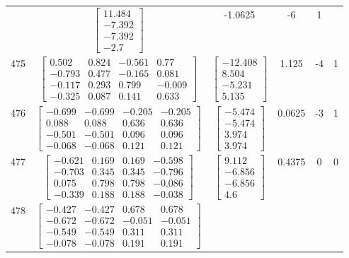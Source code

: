 \documentclass[a4paper,12pt]{article}
\begin{document}
\begin{tabular}{c c c c c c}
&
$\begin{bmatrix} 11.484 \\ -7.392 \\ -7.392 \\ -2.7 \end{bmatrix}$
&
-1.0625
&
-6
&
1
\\
475
&
$\begin{bmatrix} 0.502 & 0.824 & -0.561 & 0.77 \\ -0.793 & 0.477 & -0.165 & 0.081 \\ -0.117 & 0.293 & 0.799 & -0.009 \\ -0.325 & 0.087 & 0.141 & 0.633 \end{bmatrix}$
&
$\begin{bmatrix} -12.408 \\ 8.504 \\ -5.231 \\ 5.135 \end{bmatrix}$
&
1.125
&
-4
&
1
\\
476
&
$\begin{bmatrix} -0.699 & -0.699 & -0.205 & -0.205 \\ 0.088 & 0.088 & 0.636 & 0.636 \\ -0.501 & -0.501 & 0.096 & 0.096 \\ -0.068 & -0.068 & 0.121 & 0.121 \end{bmatrix}$
&
$\begin{bmatrix} -5.474 \\ -5.474 \\ 3.974 \\ 3.974 \end{bmatrix}$
&
0.0625
&
-3
&
1
\\
477
&
$\begin{bmatrix} -0.621 & 0.169 & 0.169 & -0.598 \\ -0.703 & 0.345 & 0.345 & -0.796 \\ 0.075 & 0.798 & 0.798 & -0.086 \\ -0.339 & 0.188 & 0.188 & -0.038 \end{bmatrix}$
&
$\begin{bmatrix} 9.112 \\ -6.856 \\ -6.856 \\ 4.6 \end{bmatrix}$
&
0.4375
&
0
&
0
\\
478
&
$\begin{bmatrix} -0.427 & -0.427 & 0.678 & 0.678 \\ -0.672 & -0.672 & -0.051 & -0.051 \\ -0.549 & -0.549 & 0.311 & 0.311 \\ -0.078 & -0.078 & 0.191 & 0.191 \end{bmatrix}$

\end{tabular}
\end{document}
